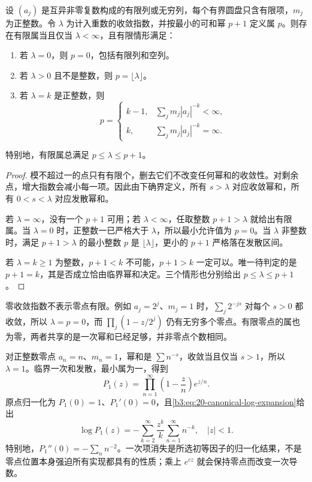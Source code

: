 \begin{proposition}[属与收敛指数]\label{b3:prop:20-genus-exponent}
设 \((a_j)\) 是互异非零复数构成的有限列或无穷列，每个有界圆盘只含有限项，\(m_j\) 为正整数。令 \(\lambda\) 为计入重数的收敛指数，并按最小的可和幂 \(p+1\) 定义属 \(p\)。则存在有限属当且仅当 \(\lambda<\infty\)，且有限情形满足：
\begin{enumerate}
\item 若 \(\lambda=0\)，则 \(p=0\)，包括有限列和空列。
\item 若 \(\lambda>0\) 且不是整数，则 \(p=\lfloor\lambda\rfloor\)。
\item 若 \(\lambda=k\) 是正整数，则
\[
 p=\begin{cases}
 k-1,&\displaystyle\sum_jm_j|a_j|^{-k}<\infty,\\
 k,&\displaystyle\sum_jm_j|a_j|^{-k}=\infty.
 \end{cases}
\]
\end{enumerate}
特别地，有限属总满足 \(p\le\lambda\le p+1\)。
\end{proposition}
\begin{proof}
模不超过一的点只有有限个，删去它们不改变任何幂和的收敛性。对剩余点，增大指数会减小每一项。因此由下确界定义，所有 \(s>\lambda\) 对应收敛幂和，所有 \(0<s<\lambda\) 对应发散幂和。

若 \(\lambda=\infty\)，没有一个 \(p+1\) 可用；若 \(\lambda<\infty\)，任取整数 \(p+1>\lambda\) 就给出有限属。当 \(\lambda=0\) 时，正整数一已严格大于 \(\lambda\)，所以最小允许值为 \(p=0\)。当 \(\lambda\) 非整数时，满足 \(p+1>\lambda\) 的最小整数 \(p\) 是 \(\lfloor\lambda\rfloor\)，更小的 \(p+1\) 严格落在发散区间。

若 \(\lambda=k\ge1\) 为整数，\(p+1<k\) 不可能，\(p+1>k\) 一定可以。唯一待判定的是 \(p+1=k\)，其是否成立恰由临界幂和决定。三个情形也分别给出 \(p\le\lambda\le p+1\)。
\end{proof}
零收敛指数不表示零点有限。例如 \(a_j=2^j\)、\(m_j=1\) 时，\(\sum_j2^{-js}\) 对每个 \(s>0\) 都收敛，所以 \(\lambda=p=0\)，而 \(\prod_j(1-z/2^j)\) 仍有无穷多个零点。有限零点的属也为零，两者共享的是一次幂和已经足够，并非零点个数相同。

\ProseParagraphBreak

对正整数零点 \(a_n=n\)、\(m_n=1\)，幂和是 \(\sum n^{-s}\)，收敛当且仅当 \(s>1\)，所以 \(\lambda=1\)。临界一次和发散，最小属为一，得到
\[
 P_1(z)=\prod_{n=1}^{\infty}\left(1-\frac zn\right)e^{z/n}.
\]
原点归一化为 \(P_1(0)=1\)、\(P_1'(0)=0\)，且\eqref{b3:eq:20-canonical-log-expansion}给出
\[
 \log P_1(z)=-\sum_{k=2}^{\infty}\frac{z^k}{k}
                 \sum_{n=1}^{\infty}n^{-k},\quad |z|<1.
\]
特别地，\(P_1''(0)=-\sum_n n^{-2}\)。一次项消失是所选初等因子的归一化结果，不是零点位置本身强迫所有实现都具有的性质；乘上 \(e^{cz}\) 就会保持零点而改变一次导数。


